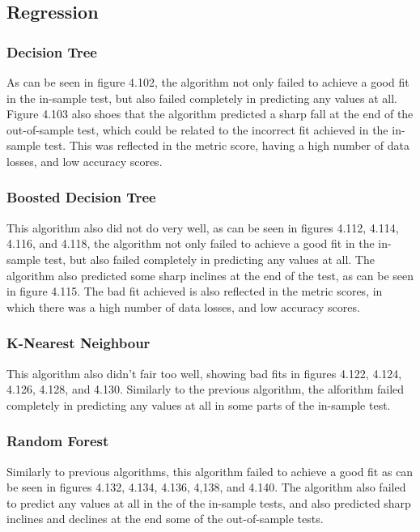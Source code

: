 \subsection{Regression}

\subsubsection{Decision Tree}
As can be seen in figure 4.102, the algorithm not only failed to achieve a good fit in the in-sample test, but also failed completely in predicting any values at all. Figure 4.103 also shoes that the algorithm predicted a sharp fall at the end of the out-of-sample test, which could be related to the incorrect fit achieved in the in-sample test. This was reflected in the metric score, having a high number of data losses, and low accuracy scores.

\subsubsection{Boosted Decision Tree}
This algorithm also did not do very well, as can be seen in figures 4.112, 4.114, 4.116, and 4.118, the algorithm not only failed to achieve a good fit in the in-sample test, but also failed completely in predicting any values at all. The algorithm also predicted some sharp inclines at the end of the test, as can be seen in figure 4.115. The bad fit achieved is also reflected in the metric scores, in which there was a high number of data losses, and low accuracy scores.

\subsubsection{K-Nearest Neighbour}
This algorithm also didn't fair too well, showing bad fits in figures 4.122, 4.124, 4.126, 4.128, and 4.130. Similarly to the previous algorithm, the alforithm failed completely in predicting any values at all in some parts of the in-sample test.

\subsubsection{Random Forest}
Similarly to previous algorithms, this algorithm failed to achieve a good fit as can be seen in figures 4.132, 4.134, 4.136, 4,138, and 4.140. The algorithm also failed to predict any values at all in the of the in-sample tests, and also predicted sharp inclines and declines at the end some of the out-of-sample tests.

